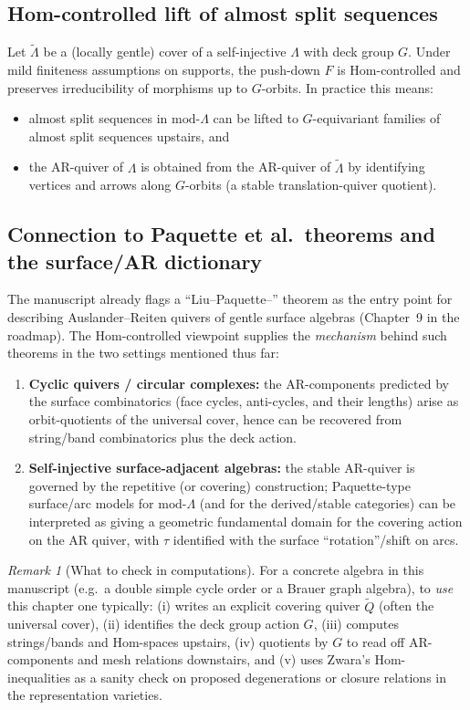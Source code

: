 \documentclass[11pt,oneside]{amsbook}
\numberwithin{equation}{section}
\theoremstyle{plain}
\theoremstyle{definition}
\theoremstyle{remark}
\newtheorem{remark}[theorem]{Remark}
\begin{document}
\subsection{Hom-controlled lift of almost split sequences}
Let $\widetilde{\Lambda}$ be a (locally gentle) cover of a self-injective $\Lambda$ with deck group $G$.
Under mild finiteness assumptions on supports, the push-down $F$ is Hom-controlled and preserves
irreducibility of morphisms up to $G$-orbits. In practice this means:
\begin{itemize}
\item almost split sequences in $\mathrm{mod}\text{-}\Lambda$ can be lifted to $G$-equivariant families of almost split
sequences upstairs, and
\item the AR-quiver of $\Lambda$ is obtained from the AR-quiver of $\widetilde{\Lambda}$ by identifying vertices and
arrows along $G$-orbits (a stable translation-quiver quotient).
\end{itemize}

\subsection{Connection to Paquette et al.\ theorems and the surface/AR dictionary}
The manuscript already flags a ``Liu--Paquette--'' theorem as the entry point for describing Auslander--Reiten
quivers of gentle surface algebras (Chapter~9 in the roadmap). The Hom-controlled viewpoint supplies the
\emph{mechanism} behind such theorems in the two settings mentioned thus far:
\begin{enumerate}
\item \textbf{Cyclic quivers / circular complexes:} the AR-components predicted by the surface combinatorics
(face cycles, anti-cycles, and their lengths) arise as orbit-quotients of the universal cover, hence can be
recovered from string/band combinatorics plus the deck action.
\item \textbf{Self-injective surface-adjacent algebras:} the stable AR-quiver is governed by the repetitive (or
covering) construction; Paquette-type surface/arc models for $\mathrm{mod}\text{-}\Lambda$ (and for the derived/stable
categories) can be interpreted as giving a geometric fundamental domain for the covering action on the AR
quiver, with $\tau$ identified with the surface ``rotation''/shift on arcs.
\end{enumerate}

\begin{remark}[What to check in computations]
For a concrete algebra in this manuscript (e.g.\ a double simple cycle order or a Brauer graph algebra),
to \emph{use} this chapter one typically:
(i) writes an explicit covering quiver $\widetilde{Q}$ (often the universal cover),
(ii) identifies the deck group action $G$,
(iii) computes strings/bands and Hom-spaces upstairs,
(iv) quotients by $G$ to read off AR-components and mesh relations downstairs,
and (v) uses Zwara's Hom-inequalities as a sanity check on proposed degenerations or closure relations in the
representation varieties.
\end{remark}
\end{document}
